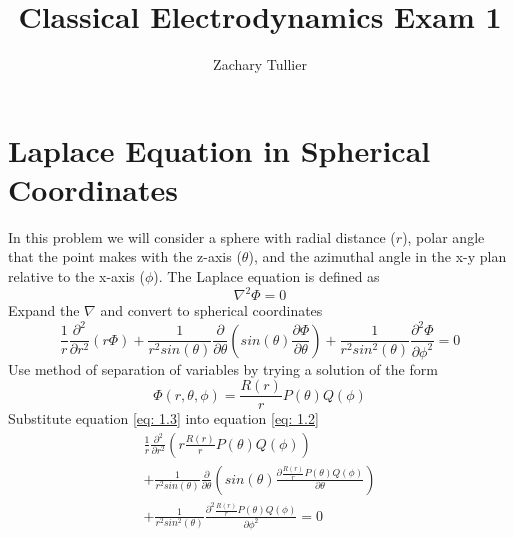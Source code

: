 \documentclass[12pt]{article}
\begin{document}
\title{Classical Electrodynamics Exam 1}

\author[1]{Zachary Tullier}

\maketitle

\section{Laplace Equation in Spherical Coordinates} \label{problem1}
    In this problem we will consider a sphere with radial distance ($r$), polar angle that the point makes with the z-axis ($\theta$), and the azimuthal angle in the x-y plan relative to the x-axis ($\phi$). 
    \newline The Laplace equation is defined as
    \begin{equation} \label{eq: 1.1}
        \nabla^2 \Phi = 0
    \end{equation}
    Expand the $\nabla$ and convert to spherical coordinates
    \begin{equation} \label{eq: 1.2}
        \frac{1}{r} \frac{\partial^2}{\partial r^2} (r \Phi) + \frac{1}{r^2 sin(\theta)} \frac{\partial}{\partial \theta} \left(sin(\theta) \frac{\partial \Phi}{\partial \theta} \right) + \frac{1}{r^2 sin^2(\theta)} \frac{\partial^2 \Phi}{\partial \phi^2} = 0
    \end{equation}
    Use method of separation of variables by trying a solution of the form
    \begin{equation} \label{eq: 1.3}
        \Phi(r,\theta,\phi) = \frac{R(r)}{r} P(\theta) Q(\phi)
    \end{equation}
    Substitute equation \ref{eq: 1.3} into equation \ref{eq: 1.2}
    \begin{equation} \label{eq: 1.4}
        \begin{split}
        \frac{1}{r} \frac{\partial^2}{\partial r^2} \left(r \frac{R(r)}{r} P(\theta) Q(\phi) \right) 
        \\ + \frac{1}{r^2 sin(\theta)} \frac{\partial}{\partial \theta} \left(sin(\theta) \frac{\partial \frac{R(r)}{r} P(\theta) Q(\phi)}{\partial \theta}\right) 
        \\+ \frac{1}{r^2 sin^2(\theta)} \frac{\partial^2 \frac{R(r)}{r} P(\theta) Q(\phi)}{\partial \phi^2} = 0
        \end{split}
    \end{equation}
\end{document}
